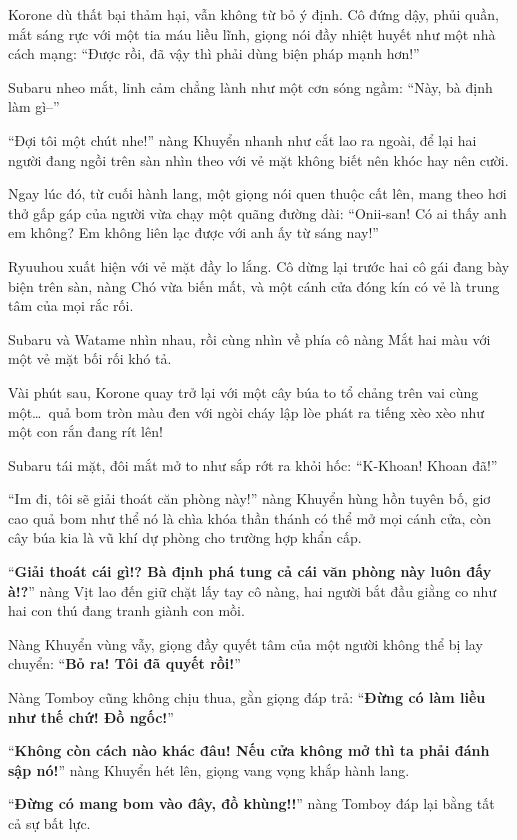 \documentclass[../main.tex]{subfiles}
\begin{document}
Korone dù thất bại thảm hại, vẫn không từ bỏ ý định. Cô đứng dậy, phủi quần, mắt sáng rực với một tia máu liều lĩnh, giọng nói đầy nhiệt huyết như một nhà cách mạng: ``Được rồi, đã vậy thì phải dùng biện pháp mạnh hơn!''

Subaru nheo mắt, linh cảm chẳng lành như một cơn sóng ngầm: ``Này, bà định làm gì--''

``Đợi tôi một chút nhe!'' nàng Khuyển nhanh như cắt lao ra ngoài, để lại hai người đang ngồi trên sàn nhìn theo với vẻ mặt không biết nên khóc hay nên cười.

Ngay lúc đó, từ cuối hành lang, một giọng nói quen thuộc cất lên, mang theo hơi thở gấp gáp của người vừa chạy một quãng đường dài: ``Onii-san! Có ai thấy anh em không? Em không liên lạc được với anh ấy từ sáng nay!''

Ryuuhou xuất hiện với vẻ mặt đầy lo lắng. Cô dừng lại trước hai cô gái đang bày biện trên sàn, nàng Chó vừa biến mất, và một cánh cửa đóng kín có vẻ là trung tâm của mọi rắc rối.

Subaru và Watame nhìn nhau, rồi cùng nhìn về phía cô nàng Mắt hai màu với một vẻ mặt bối rối khó tả.

\ct

Vài phút sau, Korone quay trở lại với một cây búa to tổ chảng trên vai cùng một\dots\ quả bom tròn màu đen với ngòi cháy lập lòe phát ra tiếng xèo xèo như một con rắn đang rít lên!

Subaru tái mặt, đôi mắt mở to như sắp rớt ra khỏi hốc: ``K-Khoan! Khoan đã!''

``Im đi, tôi sẽ giải thoát căn phòng này!'' nàng Khuyển hùng hồn tuyên bố, giơ cao quả bom như thể nó là chìa khóa thần thánh có thể mở mọi cánh cửa, còn cây búa kia là vũ khí dự phòng cho trường hợp khẩn cấp.

``\textbf{Giải thoát cái gì!? Bà định phá tung cả cái văn phòng này luôn đấy à!?}'' nàng Vịt lao đến giữ chặt lấy tay cô nàng, hai người bắt đầu giằng co như hai con thú đang tranh giành con mồi.

Nàng Khuyển vùng vẫy, giọng đầy quyết tâm của một người không thể bị lay chuyển: ``\textbf{Bỏ ra! Tôi đã quyết rồi!}''

Nàng Tomboy cũng không chịu thua, gằn giọng đáp trả: ``\textbf{Đừng có làm liều như thế chứ! Đồ ngốc!}''

``\textbf{Không còn cách nào khác đâu! Nếu cửa không mở thì ta phải đánh sập nó!}'' nàng Khuyển hét lên, giọng vang vọng khắp hành lang.

``\textbf{Đừng có mang bom vào đây, đồ khùng!!}'' nàng Tomboy đáp lại bằng tất cả sự bất lực.
\end{document}
